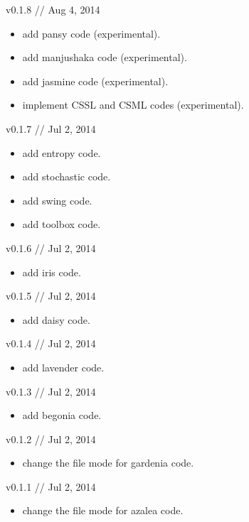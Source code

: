 v0.1.8 // Aug 4, 2014

\begin{itemize}
\item add pansy code (experimental).
\item add manjushaka code (experimental).
\item add jasmine code (experimental).
\item implement CSSL and CSML codes (experimental).
\end{itemize}


v0.1.7 // Jul 2, 2014

\begin{itemize}
\item add entropy code.
\item add stochastic code.
\item add swing code.
\item add toolbox code.
\end{itemize}


v0.1.6 // Jul 2, 2014

\begin{itemize}
\item add iris code.
\end{itemize}


v0.1.5 // Jul 2, 2014

\begin{itemize}
\item add daisy code.
\end{itemize}


v0.1.4 // Jul 2, 2014

\begin{itemize}
\item add lavender code.
\end{itemize}


v0.1.3 // Jul 2, 2014

\begin{itemize}
\item add begonia code.
\end{itemize}


v0.1.2 // Jul 2, 2014

\begin{itemize}
\item change the file mode for gardenia code.
\end{itemize}


v0.1.1 // Jul 2, 2014

\begin{itemize}
\item change the file mode for azalea code.
\end{itemize}


